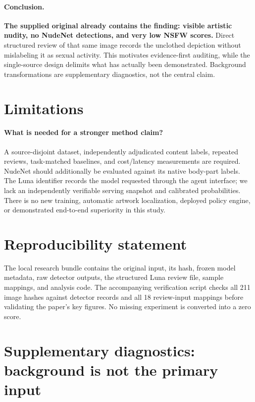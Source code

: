 \documentclass[11pt]{article}
\begin{document}
\paragraph{Conclusion.}
\textbf{The supplied original already contains the finding: visible artistic
nudity, no NudeNet detections, and very low NSFW scores.} Direct structured
review of that same image records the unclothed depiction without mislabeling
it as sexual activity. This motivates evidence-first auditing, while the single-source design delimits what has actually been demonstrated. Background transformations are supplementary diagnostics,
not the central claim.

\section*{Limitations}
\paragraph{What is needed for a stronger method claim?}
A source-disjoint dataset, independently adjudicated content labels, repeated
reviews, task-matched baselines, and cost/latency measurements are required.
NudeNet should additionally be evaluated against its native body-part labels.
The Luna identifier records the model requested through the agent interface;
we lack an independently verifiable serving snapshot and calibrated
probabilities. There is no new training, automatic artwork localization,
deployed policy engine, or demonstrated end-to-end superiority in this study.

\section*{Reproducibility statement}
The local research bundle contains the original input, its hash, frozen model
metadata, raw detector outputs, the structured Luna review file, sample mappings, and
analysis code. The accompanying verification script checks all 211 image hashes
against detector records and all 18 review-input mappings before validating the
paper's key figures. No missing experiment is converted into a zero score.



\appendix
\section{Supplementary diagnostics: background is not the primary input}
\label{app:background}
\end{document}
